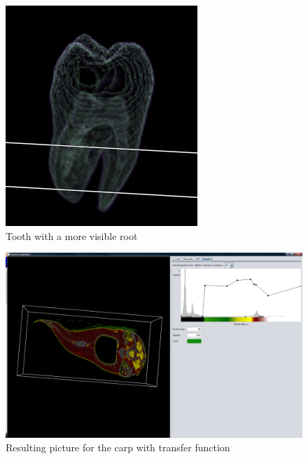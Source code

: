 \documentclass[a4paper,twoside,11pt]{article}
\begin{document}
\begin{figure}[H]
  \includegraphics[width=\linewidth]{images/toothOp2}
  \caption{Tooth with a more visible root}\label{toothOp2}
\endminipage\hfill
 \end{figure}

\begin{figure}[!h]
  \centering
  \includegraphics[width=1\textheight, angle=90]{hicarp.png}
  \caption{Resulting picture for the carp with transfer function}
  \label{hi}
\end{figure}
\end{document}
